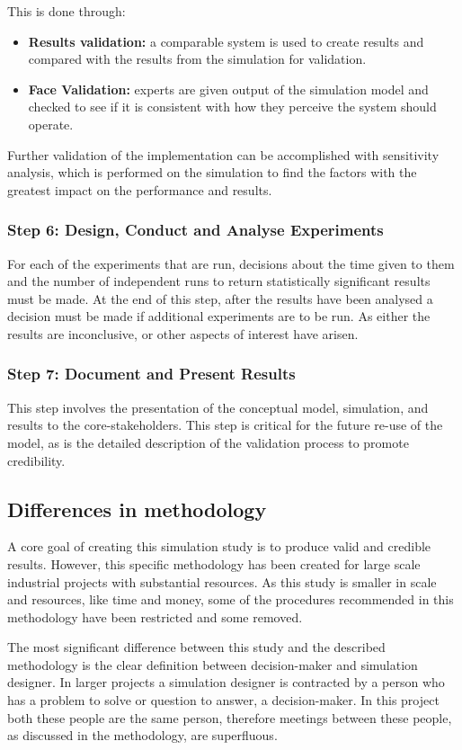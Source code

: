 This is done through:
\begin{itemize}
  \item \textbf{Results validation: } a comparable system is used to create results and compared with the results from the simulation for validation.
  \item \textbf{Face Validation: } experts are given output of the simulation model and checked to see if it is consistent with how they perceive the system should operate.
\end{itemize}

Further validation of the implementation can be accomplished with sensitivity analysis,
which is performed on the simulation to find the factors with the greatest impact on the performance and results.

\subsubsection{Step 6: Design, Conduct and Analyse Experiments}
For each of the experiments that are run, decisions about the time given to them and the number of independent runs to return statistically significant results must be made.
At the end of this step, after the results have been analysed a decision must be made if additional experiments are to be run.
As either the results are inconclusive, or other aspects of interest have arisen.

\subsubsection{Step 7: Document and Present Results}
This step involves the presentation of the conceptual model, simulation, and results to the core-stakeholders.
This step is critical for the future re-use of the model, as is the detailed description of the validation process to promote credibility.

\subsection{Differences in methodology}
A core goal of creating this simulation study is to produce valid and credible results.
However, this specific methodology has been created for large scale industrial projects with substantial resources.
As this study is smaller in scale and resources, like time and money, some of the procedures recommended in this methodology have been restricted and some removed.

The most significant difference between this study and the described methodology is the clear definition between decision-maker and simulation designer.
In larger projects a simulation designer is contracted by a person who has a problem to solve or question to answer, a decision-maker.
In this project both these people are the same person, therefore meetings between these people, as discussed in the methodology, are superfluous.

